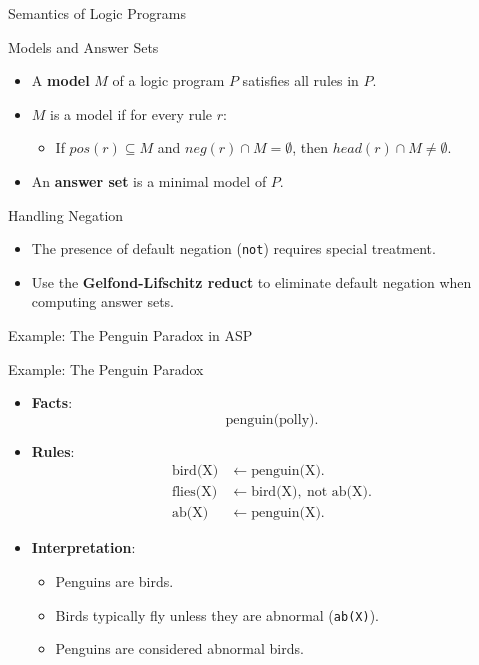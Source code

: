 \begin{frame}{Semantics of Logic Programs}
    \begin{block}{Models and Answer Sets}
        \begin{itemize}
            \item A \textbf{model} \(M\) of a logic program \(P\) satisfies all rules in \(P\).
            \item \(M\) is a model if for every rule \(r\):
                  \begin{itemize}
                      \item If \(pos(r) \subseteq M\) and \(neg(r) \cap M = \emptyset\), then \(head(r) \cap M \neq \emptyset\).
                  \end{itemize}
            \item An \textbf{answer set} is a minimal model of \(P\).
        \end{itemize}
    \end{block}
    \begin{block}{Handling Negation}
        \begin{itemize}
            \item The presence of default negation (\texttt{not}) requires special treatment.
            \item Use the \textbf{Gelfond-Lifschitz reduct} to eliminate default negation when computing answer sets.
        \end{itemize}
    \end{block}
\end{frame}

\begin{frame}{Example: The Penguin Paradox in ASP}
    \begin{exampleblock}{Example: The Penguin Paradox}
        \begin{itemize}
            \item \textbf{Facts}:
                  \[
                      \text{penguin(polly)}.
                  \]
            \item \textbf{Rules}:
                  \begin{align*}
                      \text{bird(X)}  & \leftarrow \text{penguin(X)}.                         \\
                      \text{flies(X)} & \leftarrow \text{bird(X)}, \ \text{not }\text{ab(X)}. \\
                      \text{ab(X)}    & \leftarrow \text{penguin(X)}.
                  \end{align*}
            \item \textbf{Interpretation}:
                  \begin{itemize}
                      \item Penguins are birds.
                      \item Birds typically fly unless they are abnormal (\texttt{ab(X)}).
                      \item Penguins are considered abnormal birds.
                  \end{itemize}
        \end{itemize}
    \end{exampleblock}
\end{frame}

